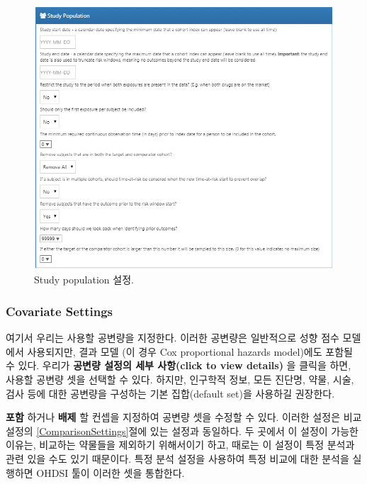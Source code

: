 \documentclass[11pt]{book}
\theoremstyle{definition}
\theoremstyle{definition}
\theoremstyle{definition}
\theoremstyle{remark}
\begin{document}
\begin{figure}

{\centering \includegraphics[width=1\linewidth]{images/PopulationLevelEstimation/studyPopulation} 

}

\caption{Study population 설정.}\label{fig:studyPopulation}
\end{figure}

\subsubsection*{Covariate Settings}\label{covariate-settings}

여기서 우리는 사용할 공변량을 지정한다. 이러한 공변량은 일반적으로 성향
점수 모델에서 사용되지만, 결과 모델 (이 경우 Cox proportional hazards
model)에도 포함될 수 있다. 우리가 \textbf{공변량 설정의 세부 사항(click
to view details)} 을 클릭을 하면, 사용할 공변량 셋을 선택할 수 있다.
하지만, 인구학적 정보, 모든 진단명, 약물, 시술, 검사 등에 대한 공변량을
구성하는 기본 집합(default set)을 사용하길 권장한다.

\textbf{포함} 하거나 \textbf{배제} 할 컨셉을 지정하여 공변량 셋을 수정할
수 있다. 이러한 설정은 비교 설정의 \ref{ComparisonSettings}절에 있는
설정과 동일하다. 두 곳에서 이 설정이 가능한 이유는, 비교하는 약물들을
제외하기 위해서이기 하고, 때로는 이 설정이 특정 분석과 관련 있을 수도
있기 때문이다. 특정 분석 설정을 사용하여 특정 비교에 대한 분석을
실행하면 OHDSI 툴이 이러한 셋을 통합한다.
\end{document}
